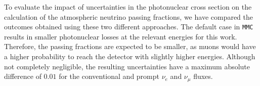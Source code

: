 \documentclass[aps,prd,showpacs,letterpaper,onecolumn,longbibliography,superscriptaddress,notitlepage,nofootinbib]{revtex4-1}%
\newcommand{\MMC}{\texttt{MMC}}
\begin{document}
To evaluate the impact of uncertainties in the photonuclear cross section on the calculation of the atmospheric neutrino passing fractions, we have compared the outcomes obtained using these two different approaches. The default case in \MMC{} results in smaller photonuclear losses at the relevant energies for this work. Therefore, the passing fractions are expected to be smaller, as muons would have a higher probability to reach the detector with slightly higher energies. Although not completely negligible, the resulting uncertainties have a maximum absolute difference of $0.01$ for the conventional and prompt $\nu_e$ and $\nu_\mu$ fluxes.

\begin{figure}[h!]
\centering
    \\[2ex]
\end{figure}
\end{document}
